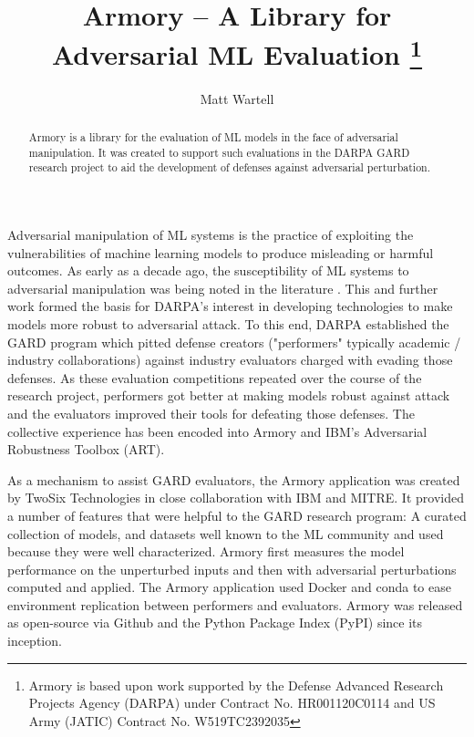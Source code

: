\documentclass[letterpaper]{article}
\title{Armory -- A Library for Adversarial ML Evaluation
    \thanks{Armory is based upon work supported by the Defense Advanced Research
        Projects Agency (DARPA) under Contract No. HR001120C0114 and
        US Army (JATIC) Contract No. W519TC2392035}
}
\author{
    Matt Wartell
}
\begin{document}
\maketitle

\begin{abstract}

    Armory is a library for the evaluation of ML models in the face of adversarial
    manipulation. It was created to support such evaluations in the DARPA
    GARD research project to aid the development of defenses against adversarial
    perturbation.


\end{abstract}


Adversarial manipulation of ML systems is the practice of exploiting the vulnerabilities
of machine learning models to produce misleading or harmful outcomes. As early as a
decade ago, the susceptibility of ML systems to adversarial manipulation was being noted
in the literature \cite{szegedy2014intriguing}. This and further work formed the basis
for DARPA's interest in developing technologies to make models more robust to
adversarial attack. To this end, DARPA established the GARD program which pitted defense
creators ("performers" typically academic / industry collaborations) against industry
evaluators charged with evading those defenses. As these evaluation competitions
repeated over the course of the research project, performers got better at making models
robust against attack and the evaluators improved their tools for defeating those
defenses. The collective experience has been encoded into Armory and IBM's Adversarial
Robustness Toolbox (ART).

As a mechanism to assist GARD evaluators, the Armory application was created by TwoSix
Technologies in close collaboration with IBM and MITRE. It provided a number of features
that were helpful to the GARD research program: A curated collection of models, and
datasets well known to the ML community and used because they were well characterized.
Armory first measures the model performance on the unperturbed inputs and then with
adversarial perturbations computed and applied. The Armory application used Docker and
conda to ease environment replication between performers and evaluators. Armory was
released as open-source via Github and the Python Package Index (PyPI) since its
inception.
\end{document}
